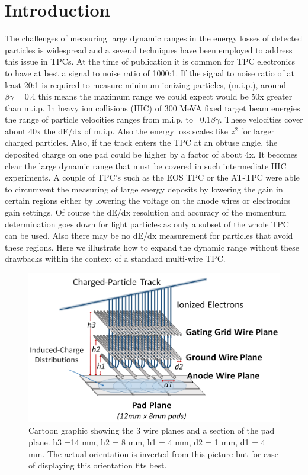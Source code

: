 \documentclass[review]{elsarticle}
\begin{document}
\section{Introduction} 
The challenges of measuring large dynamic ranges in the energy losses of detected particles is widespread and a several techniques have been employed to address this issue in TPCs. At the time of publication it is common for TPC electronics to have at best a signal to noise ratio of 1000:1. If the signal to noise ratio of at least 20:1 is required to measure minimum ionizing particles, (m.i.p.), around $\beta\gamma=0.4$ this means the maximum range we could expect would be 50x greater than m.i.p.  In heavy ion collisions (HIC) of 300 MeVA fixed target beam energies the range of particle velocities ranges from m.i.p. to ~0.1$\beta\gamma$. These velocities cover about 40x the dE/dx of m.i.p. Also the energy loss scales like $z^2$ for larger charged particles. Also, if the track enters the TPC at an obtuse angle, the deposited charge on one pad could be higher by a factor of about 4x.  It becomes clear the large dynamic range that must be covered in such intermediate HIC experiments. 
A couple of TPC's such as the EOS TPC or the AT-TPC were able to circumvent the measuring of large energy deposits by lowering the gain in certain regions either by lowering the voltage on the anode wires or electronics gain settings. Of course the dE/dx resolution and accuracy of the momentum determination goes down for light particles as only a subset of the whole TPC can be used. Also there may be no dE/dx measurement for particles that avoid these regions. Here we illustrate how to expand the dynamic range without these drawbacks within the context of a standard multi-wire TPC. 

\begin{figure}[ht]
\label{fig:padwire}
\includegraphics[width=\linewidth]{padwire}
\caption{Cartoon graphic showing the 3 wire planes and a section of the pad plane. h3 =14 mm, h2 = 8 mm, h1 = 4 mm, d2 = 1 mm, d1 = 4 mm. The actual orientation is inverted from this picture but for ease of displaying this orientation fits best.}
\end{figure}
\end{document}
